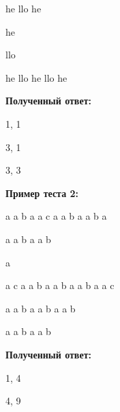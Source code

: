 he llo he

he  
      
    llo      
      
he    llo   he llo   he

\textbf{Полученный ответ:}

1, 1

3, 1

3, 3

\textbf{Пример теста 2:}

a a b a a c a a b a a b a

a a b a a b

a

a c a a b a a b a a b a a c

a a b a a b a a b

a a b a a b

\textbf{Полученный ответ:}

1, 4

4, 9

\pagebreak

